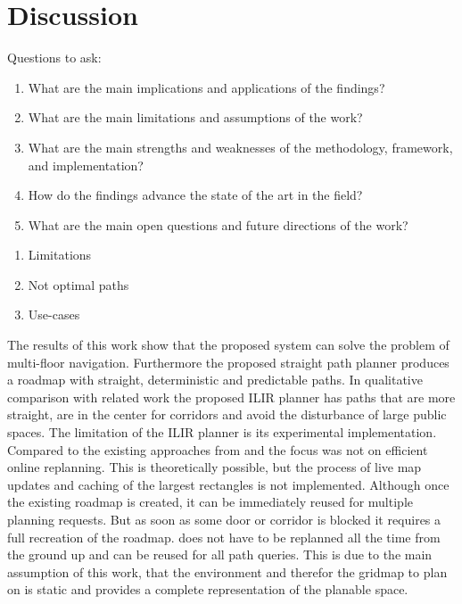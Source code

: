 \chapter{Discussion}
\label{sec:discussion}
Questions to ask:
\begin{enumerate}
    \item What are the main implications and applications of the findings? 
    \item What are the main limitations and assumptions of the work? 
    \item What are the main strengths and weaknesses of the methodology, framework, and implementation? 
    \item How do the findings advance the state of the art in the field? 
    \item What are the main open questions and future directions of the work? 
\end{enumerate}

\begin{enumerate}
    \item Limitations
    \item Not optimal paths
    \item Use-cases
\end{enumerate}

The results of this work show that the proposed system can solve the problem of multi-floor navigation. Furthermore the proposed straight path planner produces a roadmap with straight, deterministic and predictable paths. In qualitative comparison with related work the proposed ILIR planner has paths that are more straight, are in the center for corridors and avoid the disturbance of large public spaces. The limitation of the ILIR planner is its experimental implementation. Compared to the existing approaches from \cite{cagigas_hierarchical_2005} and \cite{seder_hierarchical_2011} the focus was not on efficient online replanning. This is theoretically possible, but the process of live map updates and caching of the largest rectangles is not implemented. Although once the existing roadmap is created, it can be immediately reused for multiple planning requests. But as soon as some door or corridor is blocked it requires a full recreation of the roadmap. does not have to be replanned all the time from the ground up and can be reused for all path queries. This is due to the main assumption of this work, that the environment and therefor the gridmap to plan on is static and provides a complete representation of the planable space. 

